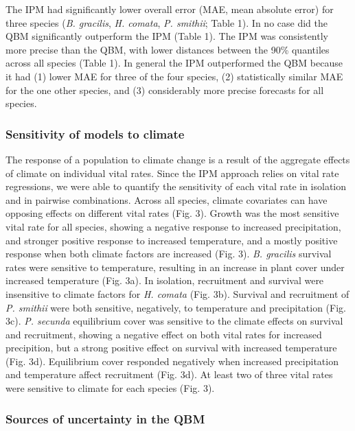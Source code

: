 \documentclass[12pt,]{article}
\begin{document}
The IPM had significantly lower overall error (MAE, mean absolute error)
for three species (\emph{B. gracilis}, \emph{H. comata}, \emph{P.
smithii}; Table 1). In no case did the QBM significantly outperform the
IPM (Table 1). The IPM was consistently more precise than the QBM, with
lower distances between the 90\% quantiles across all species (Table 1).
In general the IPM outperformed the QBM because it had (1) lower MAE for
three of the four species, (2) statistically similar MAE for the one
other species, and (3) considerably more precise forecasts for all
species.

\subsubsection{Sensitivity of models to
climate}\label{sensitivity-of-models-to-climate}

The response of a population to climate change is a result of the
aggregate effects of climate on individual vital rates. Since the IPM
approach relies on vital rate regressions, we were able to quantify the
sensitivity of each vital rate in isolation and in pairwise
combinations. Across all species, climate covariates can have opposing
effects on different vital rates (Fig. 3). Growth was the most sensitive
vital rate for all species, showing a negative response to increased
precipitation, and stronger positive response to increased temperature,
and a mostly positive response when both climate factors are increased
(Fig. 3). \emph{B. gracilis} survival rates were sensitive to
temperature, resulting in an increase in plant cover under increased
temperature (Fig. 3a). In isolation, recruitment and survival were
insensitive to climate factors for \emph{H. comata} (Fig. 3b). Survival
and recruitment of \emph{P. smithii} were both sensitive, negatively, to
temperature and precipitation (Fig. 3c). \emph{P. secunda} equilibrium
cover was sensitive to the climate effects on survival and recruitment,
showing a negative effect on both vital rates for increased precipition,
but a strong positive effect on survival with increased temperature
(Fig. 3d). Equilibrium cover responded negatively when increased
precipitation and temperature affect recruitment (Fig. 3d). At least two
of three vital rates were sensitive to climate for each species (Fig.
3).

\subsubsection{Sources of uncertainty in the
QBM}\label{sources-of-uncertainty-in-the-qbm}
\end{document}
